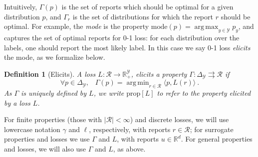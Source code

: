 \documentclass[12pt]{article}
\newcommand{\Comments}{1}
\newcommand{\mytodo}[2]{\ifnum\Comments=1%
  \todo[linecolor=#1!80!black,backgroundcolor=#1,bordercolor=#1!80!black]{#2}\fi}
\newcommand{\raft}[1]{\mytodo{green!20!white}{RF: #1}}
\newcommand{\jessiet}[1]{\mytodo{purple!20!white}{JF: #1}}
\newcommand{\btw}[1]{}%
\newcommand{\reals}{\mathbb{R}}
\newcommand{\prop}[1]{\mathrm{prop}[#1]}
\newcommand{\mode}{\mathrm{mode}}
\newcommand{\simplex}{\Delta_\Y}
\newcommand{\R}{\mathcal{R}}
\newcommand{\Y}{\mathcal{Y}}
\newcommand{\inprod}[2]{\langle #1, #2 \rangle}%
\newcommand{\toto}{\rightrightarrows}
\DeclareMathOperator*{\argmax}{arg\,max}
\DeclareMathOperator*{\argmin}{arg\,min}
\newtheorem{definition}{Definition}
\begin{document}
Intuitively, $\Gamma(p)$ is the set of reports which should be optimal for a given distribution $p$, and $\Gamma_r$ is the set of distributions for which the report $r$ should be optimal.
\btw{Finite property note commented out}%
For example, the \emph{mode} is the %
property $\mode(p) = \argmax_{y\in\Y} p_y$, and captures the set of optimal reports for 0-1 loss: for each distribution over the labels, one should report the most likely label.
In this case we say 0-1 loss \emph{elicits} the mode, as we formalize below.

\begin{definition}[Elicits]
  \label{def:elicits}
  A loss $L:\R\to\reals^\Y_+$, \emph{elicits} a property $\Gamma:\simplex \toto \R$ if
  \begin{equation}
    \forall p\in\simplex,\;\;\;\Gamma(p) = \argmin_{r \in \R} \inprod{p}{L(r)}~.
  \end{equation}
  As $\Gamma$ is uniquely defined by $L$, we write $\prop{L}$ to refer to the property elicited by a loss $L$.
\end{definition}

For finite properties (those with $|\R|<\infty$) and discrete losses, we will use lowercase notation $\gamma$ and $\ell$, respectively, with reports $r\in\R$; for surrogate properties and losses we use $\Gamma$ and $L$, with reports $u\in\reals^d$.
For general properties and losses, we will also use $\Gamma$ and $L$, as above.

\end{document}

